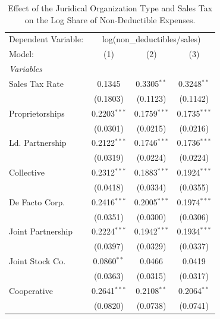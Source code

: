 \documentclass[
  12pt]{article}
\begin{document}
\begin{table}

\caption{\label{tbl-reg-non-ded}Effect of the Juridical Organization
Type and Sales Tax on the Log Share of Non-Deductible Expenses.}

\begin{minipage}{\linewidth}

\begingroup
\centering
\begin{tabular}{lccc}
   \tabularnewline \midrule \midrule
   Dependent Variable: & \multicolumn{3}{c}{log(non\_deductibles/sales)}\\
   Model:            & (1)            & (2)            & (3)\\  
   \midrule
   \emph{Variables}\\
   Sales Tax Rate    & 0.1345         & 0.3305$^{**}$  & 0.3248$^{**}$\\   
                     & (0.1803)       & (0.1123)       & (0.1142)\\   
   Proprietorships   & 0.2203$^{***}$ & 0.1759$^{***}$ & 0.1735$^{***}$\\   
                     & (0.0301)       & (0.0215)       & (0.0216)\\   
   Ld. Partnership   & 0.2122$^{***}$ & 0.1746$^{***}$ & 0.1736$^{***}$\\   
                     & (0.0319)       & (0.0224)       & (0.0224)\\   
   Collective        & 0.2312$^{***}$ & 0.1883$^{***}$ & 0.1924$^{***}$\\   
                     & (0.0418)       & (0.0334)       & (0.0355)\\   
   De Facto Corp.    & 0.2416$^{***}$ & 0.2005$^{***}$ & 0.1974$^{***}$\\   
                     & (0.0351)       & (0.0300)       & (0.0306)\\   
   Joint Partnership & 0.2224$^{***}$ & 0.1942$^{***}$ & 0.1934$^{***}$\\   
                     & (0.0397)       & (0.0329)       & (0.0337)\\   
   Joint Stock Co.   & 0.0860$^{**}$  & 0.0466         & 0.0419\\   
                     & (0.0363)       & (0.0315)       & (0.0317)\\   
   Cooperative       & 0.2641$^{***}$ & 0.2108$^{**}$  & 0.2064$^{**}$\\   
                     & (0.0820)       & (0.0738)       & (0.0741)\\   

\end{tabular}
\end{minipage}
\end{table}
\end{document}
